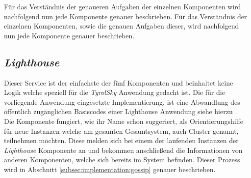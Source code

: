 Für das Verständnis der genaueren Aufgaben der einzelnen Komponenten wird nachfolgend nun jede Komponente genauer beschrieben.
Für das Verständnis der einzelnen Komponenten, sowie die genauen Aufgaben dieser, wird nachfolgend nun jede Komponente genauer beschrieben.

\subsection{\textit{Lighthouse}}
\label{subsec:implementation:lighthouse}
Dieser Service ist der einfachste der fünf Komponenten und beinhaltet keine Logik welche speziell für die \textit{TyrolSky} Anwendung gedacht ist. Die für die vorliegende Anwendung eingesetzte Implementierung, ist eine Abwandlung des öffentlich zugänglichen Basiscodes einer Lighthouse Anwendung siehe hierzu \cite{lighthouse}. \\
Die Komponente fungiert, wie ihr Name schon suggeriert, als Orientierungshilfe für neue Instanzen welche am gesamten Gesamtsystem, auch Cluster genannt, teilnehmen möchten. Diese melden sich bei einem der laufenden Instanzen der \textit{Lighthouse} Komponente an und bekommen anschließend die Informationen von anderen Komponenten, welche sich bereits im System befinden. Dieser Prozess wird in Abschnitt \ref{subsec:implementation:gossip} genauer beschrieben.

